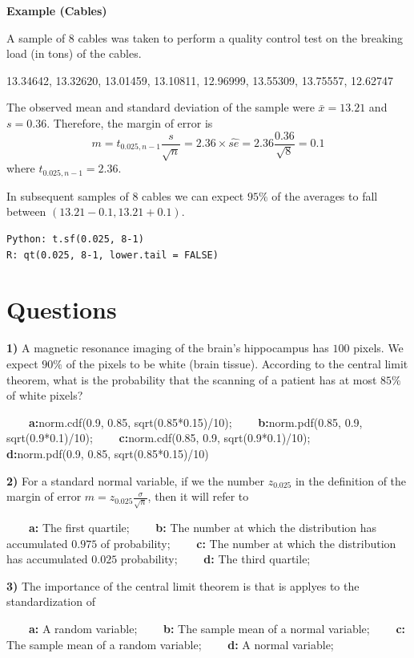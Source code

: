 \documentclass[
]{book}
\begin{document}
\textbf{Example (Cables)}

A sample of 8 cables was taken to perform a quality control test on the breaking load (in tons) of the cables.

13.34642, 13.32620, 13.01459, 13.10811, 12.96999, 13.55309, 13.75557, 12.62747

The observed mean and standard deviation of the sample were \(\bar{x}=13.21\) and \(s=0.36\). Therefore, the margin of error is \[m=t_{0.025, n-1} \frac{s}{\sqrt{n}}=2.36\times \hat{se}=2.36\frac{0.36}{\sqrt{8}}=0.1\]
where \(t_{0.025, n-1}=2.36\).

In subsequent samples of \(8\) cables we can expect \(95\%\) of the averages to fall between \((13.21-0.1,13.21+0.1)\).

\begin{verbatim}
Python: t.sf(0.025, 8-1) 
R: qt(0.025, 8-1, lower.tail = FALSE)
\end{verbatim}

\hypertarget{questions-8}{%
\section{Questions}\label{questions-8}}

\textbf{1)} A magnetic resonance imaging of the brain's hippocampus has \(100\) pixels. We expect \(90\%\) of the pixels to be white (brain tissue). According to the central limit theorem, what is the probability that the scanning of a patient has at most \(85\%\) of white pixels?

\textbf{\(\qquad\)a:}norm.cdf(0.9, 0.85, sqrt(0.85*0.15)/10); \textbf{\(\qquad\)b:}norm.pdf(0.85, 0.9,
sqrt(0.9*0.1)/10); \textbf{\(\qquad\)c:}norm.cdf(0.85, 0.9, sqrt(0.9*0.1)/10); \textbf{\(\qquad\)d:}norm.pdf(0.9, 0.85, sqrt(0.85*0.15)/10)

\textbf{2)} For a standard normal variable, if we the number \(z_{0.025}\) in the definition of the margin of error \(m=z_{0.025} \frac{\sigma}{\sqrt{n}}\), then it will refer to

\textbf{\(\qquad\)a:} The first quartile; \textbf{\(\qquad\)b:} The number at which the distribution has accumulated \(0.975\) of probability; \textbf{\(\qquad\)c:} The number at which the distribution has accumulated \(0.025\) probability; \textbf{\(\qquad\)d:} The third quartile;

\textbf{3)} The importance of the central limit theorem is that is applyes to the standardization of

\textbf{\(\qquad\)a:} A random variable;
\textbf{\(\qquad\)b:} The sample mean of a normal variable;
\textbf{\(\qquad\)c:} The sample mean of a random variable;
\textbf{\(\qquad\)d:} A normal variable;
\end{document}
